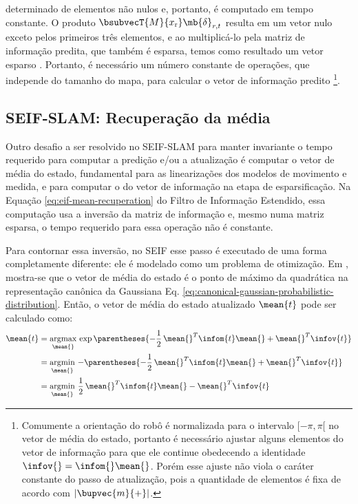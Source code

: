 determinado de elementos não nulos e, portanto, é computado em tempo 
constante. O produto $\bsubvecT{M}{x_\mathrm{r}} \mb{\delta}_{r,t}$ 
resulta em um vetor nulo exceto pelos primeiros três elementos, e ao 
multiplicá-lo pela matriz de informação predita, que também é esparsa, 
temos como resultado um vetor esparso 
\cite[p.~398]{bongard2006probabilistic}. Portanto, é necessário um número 
constante de operações, que independe do tamanho do mapa, para calcular o 
vetor de informação predito \footnote{Comumente a orientação do robô é 
normalizada para o intervalo $[-\pi, \pi[$ no vetor de média do estado, portanto é necessário 
ajustar alguns elementos do vetor de informação para que ele continue 
obedecendo a identidade $\infov{} = \infom{}\mean{}$. Porém esse ajuste não viola o caráter constante do passo de atualização, pois a quantidade de elementos é fixa de acordo com $\lvert \bupvec{m}{+} \rvert$.}.

\subsection{SEIF-SLAM: Recuperação da média}
\label{sec:seif-mean-recovery}
Outro desafio a ser resolvido no SEIF-SLAM para manter invariante o tempo requerido para computar a predição e/ou a atualização é computar o vetor de média do estado, 
fundamental para as linearizações dos modelos de movimento e medida, e para computar o do vetor de informação na etapa de esparsificação. Na Equação 
\ref{eq:eif-mean-recuperation} do Filtro de Informação Estendido, essa 
computação usa a inversão da matriz de informação 
e, mesmo numa matriz esparsa, o tempo requerido para essa operação não é constante.

Para contornar essa inversão, no SEIF esse passo é executado de uma forma completamente diferente: ele é modelado como um problema de otimização. Em 
\cite[Cap.~12.6]{bongard2006probabilistic}, mostra-se que o vetor de média do estado é o ponto de máximo da quadrática na representação canônica da Gaussiana 
Eq. \ref{eq:canonical-gaussian-probabilistic-distribution}. Então, o 
vetor de média do estado atualizado $\mean{t}$ pode ser calculado como:
\begin{equation}
  \begin{aligned}
    \mean{t} &= \mathop{\mathrm{argmax}}\limits_{\mean{}} \,\exp\parentheses{-\frac{1}{2}\,\mean{}^T\infom{t}\mean{} 
    + \mean{}^T \infov{t}}\\
    &= \mathop{\mathrm{argmin}}\limits_{\mean{}}\, - \parentheses{-\frac{1}{2}\,\mean{}^T\infom{t}\mean{} 
    + \mean{}^T \infov{t}}\\
    &= \mathop{\mathrm{argmin}}\limits_{\mean{}}\, \frac{1}{2}\,\mean{}^T\infom{t}\mean{} 
    - \mean{}^T \infov{t}
  \end{aligned}
  \label{eq:seif-mean-recuperation}
\end{equation}

